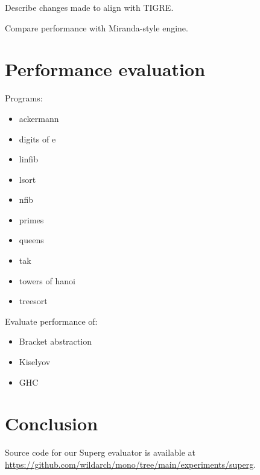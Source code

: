 \documentclass[conference]{IEEEtran}
\begin{document}
Describe changes made to align with TIGRE.

Compare performance with Miranda-style engine.

\section{Performance evaluation}
\label{sec:eval}
Programs:
\begin{itemize}
    \item ackermann
    \item digits of e
    \item linfib
    \item lsort
    \item nfib
    \item primes
    \item queens
    \item tak
    \item towers of hanoi
    \item treesort
\end{itemize}

Evaluate performance of:

\begin{itemize}
    \item Bracket abstraction
    \item Kiselyov
    \item GHC
\end{itemize}

\section{Conclusion}

Source code for our Superg evaluator is available at \url{https://github.com/wildarch/mono/tree/main/experiments/superg}.







\end{document}
